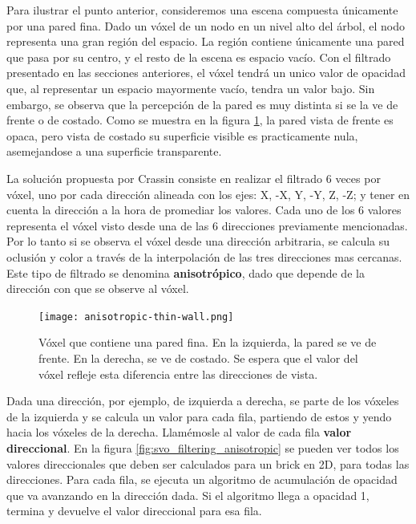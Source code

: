 Para ilustrar el punto anterior, consideremos una escena compuesta únicamente por una pared fina.
Dado un vóxel de un nodo en un nivel alto del árbol, el nodo representa una gran región del espacio.
La región contiene únicamente una pared que pasa por su centro, y el resto de la escena es espacio vacío.
Con el filtrado presentado en las secciones anteriores, el vóxel tendrá un unico valor de opacidad que, al representar un espacio mayormente vacío, tendra un valor bajo.
Sin embargo, se observa que la percepción de la pared es muy distinta si se la ve de frente o de costado.
Como se muestra en la figura \ref{fig:anisotropic-thin-wall}, la pared vista de frente es opaca, pero vista de costado su superficie visible es practicamente nula, asemejandose a una superficie transparente.

La solución propuesta por Crassin \cite{voxel-cone-tracing} consiste en realizar el filtrado 6 veces por vóxel, uno por cada dirección alineada con los ejes: X, -X, Y, -Y, Z, -Z; y tener en cuenta la dirección a la hora de promediar los valores.
Cada uno de los 6 valores representa el vóxel visto desde una de las 6 direcciones previamente mencionadas. Por lo tanto si se observa el vóxel desde una dirección arbitraria, se calcula su oclusión y color a través de la interpolación de las tres direcciones mas cercanas.
Este tipo de filtrado se denomina \textbf{anisotrópico}, dado que depende de la dirección con que se observe al vóxel.

\begin{figure}
    \centering
    \texttt{[image: anisotropic-thin-wall.png]}
    \caption{
        Vóxel que contiene una pared fina.
        En la izquierda, la pared se ve de frente.
        En la derecha, se ve de costado.
        Se espera que el valor del vóxel refleje esta diferencia entre las direcciones de vista.
    }
    \label{fig:anisotropic-thin-wall}
\end{figure}

Dada una dirección, por ejemplo, de izquierda a derecha, se parte de los vóxeles de la izquierda y se calcula un valor para cada fila, partiendo de estos y yendo hacia los vóxeles de la derecha.
Llamémosle al valor de cada fila \textbf{valor direccional}.
En la figura \ref{fig:svo_filtering_anisotropic} se pueden ver todos los valores direccionales que deben ser calculados para un brick en 2D, para todas las direcciones.
Para cada fila, se ejecuta un algoritmo de acumulación de opacidad que va avanzando en la dirección dada.
Si el algoritmo llega a opacidad 1, termina y devuelve el valor direccional para esa fila.

